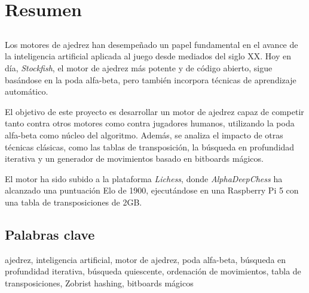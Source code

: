 \chapter*{Resumen}

\section*{\tituloPortadaVal}

Los motores de ajedrez han desempeñado un papel fundamental en el avance de la inteligencia artificial aplicada al juego desde mediados del siglo XX. Hoy en día, \textit{Stockfish}, el motor de ajedrez más potente y de código abierto, sigue basándose en la poda alfa-beta, pero también incorpora técnicas de aprendizaje automático.

\vspace{1em}

El objetivo de este proyecto es desarrollar un motor de ajedrez capaz de competir tanto contra otros motores como contra jugadores humanos, utilizando la poda alfa-beta como núcleo del algoritmo. Además, se analiza el impacto de otras técnicas clásicas, como las tablas de transposición, la búsqueda en profundidad iterativa y un generador de movimientos basado en bitboards mágicos.

\vspace{1em}

El motor ha sido subido a la plataforma \textit{Lichess}, donde \textit{AlphaDeepChess} ha alcanzado una puntuación Elo de 1900, ejecutándose en una Raspberry Pi 5 con una tabla de transposiciones de 2GB.

\section*{Palabras clave}
   
\noindent ajedrez, inteligencia artificial, motor de ajedrez, poda alfa-beta, búsqueda en profundidad iterativa, búsqueda quiescente, ordenación de movimientos, tabla de transposiciones, Zobrist hashing, bitboards mágicos
